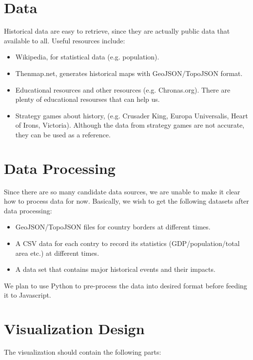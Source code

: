\documentclass[12pt, fullpage,letterpaper]{article}
\begin{document}
\section{Data}
Historical data are easy to retrieve, since they are actually public data that available to all.
Useful resources include:

\begin{itemize}
    \item Wikipedia, for statistical data (e.g. population).
    \item Thenmap.net, generates historical maps with GeoJSON/TopoJSON format.
    \item Educational resources and other resources (e.g. Chronas.org). There are plenty of educational resourses that can help us.
    \item Strategy games about history, (e.g. Crusader King, Europa Universalis, Heart of Irons, Victoria). Although the data from strategy games are not accurate, they can be used
        as a reference.
\end{itemize}

\section{Data Processing}
Since there are so many candidate data sources, we are unable to make it clear how to process data for now.
Basically, we wish to get the following datasets after data processing:
\begin{itemize}
    \item GeoJSON/TopoJSON files for country borders at different times.
    \item A CSV data for each contry to record its statistics (GDP/population/total area etc.) at different times.
    \item A data set that contains major historical events and their impacts.
\end{itemize}

We plan to use Python to pre-process the data into desired format before feeding it to Javascript.

\section{Visualization Design}

The visualization should contain the following parts:
\end{document}
